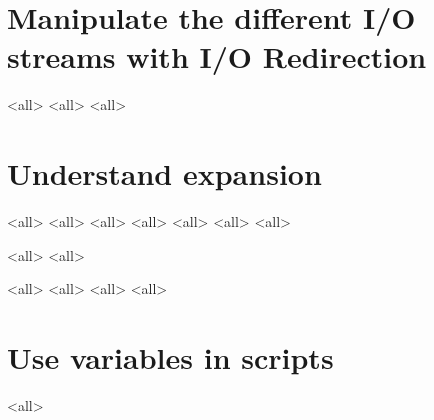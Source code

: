 \section{Manipulate the different I/O streams  with I/O Redirection}
\mode<all>{}
\mode<all>{}
\mode<all>{}


\section{Understand expansion}
\mode<all>{}
\mode<all>{}
\mode<all>{}
\mode<all>{}
\mode<all>{}
\mode<all>{}
\mode<all>{}

\mode<all>{}
\mode<all>{}

\mode<all>{}
\mode<all>{}
\mode<all>{}
\mode<all>{}


\section{Use variables in scripts}

\mode<all>{}



